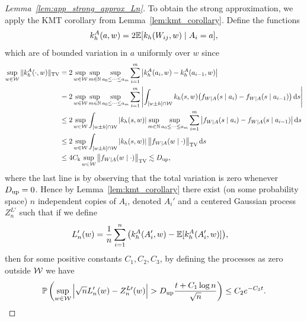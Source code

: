 \begin{proof}[Lemma~\ref{lem:app_strong_approx_Ln}]

  To obtain the strong approximation,
  we apply the KMT corollary from
  Lemma~\ref{lem:kmt_corollary}.
  Define the functions
  \begin{align*}
    k_h^A(a, w) = 2\mathbb{E}[k_h(W_{ij},w) \mid A_i = a],
  \end{align*}
  which are of bounded variation in $a$ uniformly over $w$ since
  \begin{align*}
    \sup_{w \in \mathcal{W}} \|k_h^A(\cdot,w)\|_{\mathrm{TV}}
    &=
    2\sup_{w \in \mathcal{W}}
    \sup_{m \in \mathbb{N}}
    \sup_{a_0 \leq \cdots \leq a_m}
    \sum_{i=1}^m
    \big|k_h^A(a_i,w) - k_h^A(a_{i-1},w)\big| \\
    &=
    2\sup_{w \in \mathcal{W}}
    \sup_{m \in \mathbb{N}}
    \sup_{a_0 \leq \cdots \leq a_m}
    \sum_{i=1}^m
    \left|
    \int_{[w \pm h] \cap \mathcal{W}}
    k_h(s,w)
    \big(
    f_{W \mid A}(s \mid  a_i)
    - f_{W \mid A}(s \mid  a_{i-1})
    \big)
    \,\mathrm{d}s
    \right| \\
    &\leq
    2 \sup_{w \in \mathcal{W}}
    \int_{[w \pm h] \cap \mathcal{W}}
    |k_h(s,w)|
    \sup_{m \in \mathbb{N}}
    \sup_{a_0 \leq \cdots \leq a_m}
    \sum_{i=1}^m
    \big|
    f_{W \mid A}(s \mid  a_i)
    - f_{W \mid A}(s \mid  a_{i-1})
    \big|
    \,\mathrm{d}s \\
    &\leq
    2 \sup_{w \in \mathcal{W}}
    \int_{[w \pm h] \cap \mathcal{W}}
    |k_h(s,w)|
    \,
    \big\|
    f_{W \mid A}(w \mid  \cdot)
    \big\|_{\mathrm{TV}}
    \,\mathrm{d}s \\
    &\leq
    4 C_\mathrm{k} \sup_{w \in \mathcal{W}}
    \big\|
    f_{W \mid A}(w \mid  \cdot)
    \big\|_{\mathrm{TV}}
    \lesssim
    D_{\textup{up}},
  \end{align*}
  where the last line is by observing that the total variation
  is zero whenever $D_{\textup{up}} = 0$.
  Hence by Lemma~\ref{lem:kmt_corollary}
  there exist (on some probability space)
  $n$ independent copies of $A_i$,
  denoted $A_i'$
  and a centered Gaussian process $Z_n^{L\prime}$
  such that if we define
  \begin{align*}
    L_n'(w)
    &=
    \frac{1}{n}
    \sum_{i=1}^n
    \big(k_h^A(A_i',w) -
    \mathbb{E}[k_h^A(A_i',w)]\big),
  \end{align*}
  then for some positive constants
  $C_1, C_2, C_3$,
  by defining the processes as zero outside $\mathcal{W}$
  we have
  \begin{align*}
    \P\left(
      \sup_{w \in \cW}
      \Big|\sqrt{n} L_n'(w) - Z_n^{L\prime}(w)\Big|
      > \Du \frac{t + C_1 \log n}{\sqrt n}
    \right)
    \leq C_2 e^{-C_3 t}.

\end{align*}
\end{proof}
